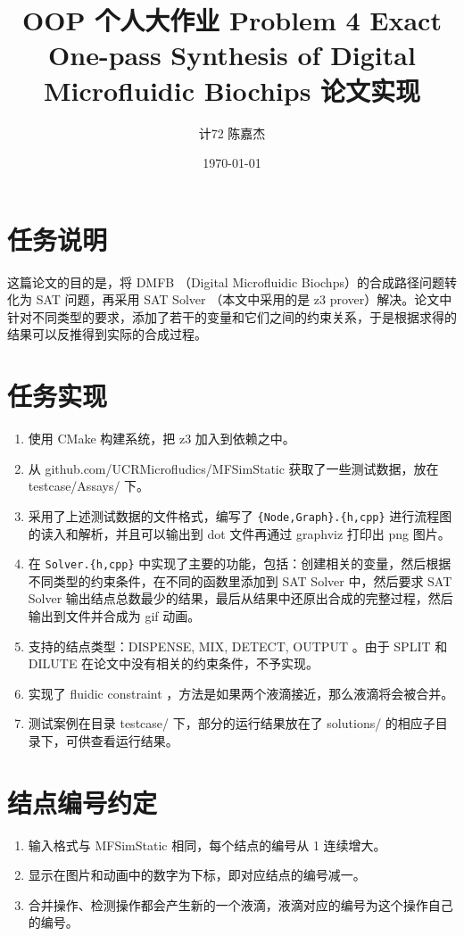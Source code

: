 \documentclass[11pt]{article}
\author{计72 陈嘉杰}
\date{\today}
\title{OOP 个人大作业 Problem 4 Exact One-pass Synthesis of Digital Microfluidic Biochips 论文实现}
\begin{document}
\maketitle
\tableofcontents

\section{任务说明}
\label{sec:org7890733}
这篇论文的目的是，将 DMFB （Digital Microfluidic Biochps）的合成路径问题转化为 SAT 问题，再采用 SAT Solver （本文中采用的是 z3 prover）解决。论文中针对不同类型的要求，添加了若干的变量和它们之间的约束关系，于是根据求得的结果可以反推得到实际的合成过程。

\section{任务实现}
\label{sec:org866e4be}
\begin{enumerate}
\item 使用 CMake 构建系统，把 z3 加入到依赖之中。
\item 从 github.com/UCRMicrofludics/MFSimStatic 获取了一些测试数据，放在 testcase/Assays/ 下。
\item 采用了上述测试数据的文件格式，编写了 \texttt{\{Node,Graph\}.\{h,cpp\}} 进行流程图的读入和解析，并且可以输出到 dot 文件再通过 graphviz 打印出 png 图片。
\item 在 \texttt{Solver.\{h,cpp\}} 中实现了主要的功能，包括：创建相关的变量，然后根据不同类型的约束条件，在不同的函数里添加到 SAT Solver 中，然后要求 SAT Solver 输出结点总数最少的结果，最后从结果中还原出合成的完整过程，然后输出到文件并合成为 gif 动画。
\item 支持的结点类型：DISPENSE, MIX, DETECT, OUTPUT 。由于 SPLIT 和 DILUTE 在论文中没有相关的约束条件，不予实现。
\item 实现了 fluidic constraint ，方法是如果两个液滴接近，那么液滴将会被合并。
\item 测试案例在目录 testcase/ 下，部分的运行结果放在了 solutions/ 的相应子目录下，可供查看运行结果。
\end{enumerate}

\section{结点编号约定}
\label{sec:org4e918c1}
\begin{enumerate}
\item 输入格式与 MFSimStatic 相同，每个结点的编号从 1 连续增大。
\item 显示在图片和动画中的数字为下标，即对应结点的编号减一。
\item 合并操作、检测操作都会产生新的一个液滴，液滴对应的编号为这个操作自己的编号。
\end{enumerate}
\end{document}
